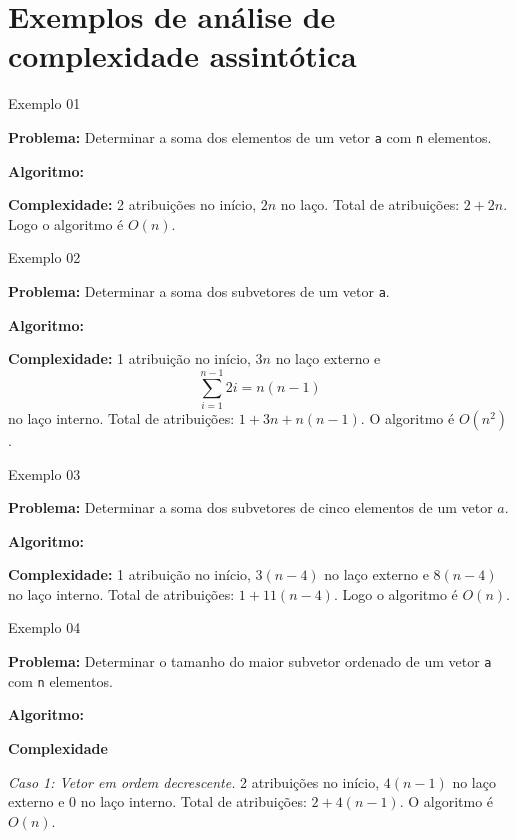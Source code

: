 \section{Exemplos de análise de complexidade assintótica}

\begin{frame}[fragile]{Exemplo 01}

	\textbf{Problema:} Determinar a soma dos elementos de um vetor \texttt{a} com \texttt{n}
     elementos.
	\vspace{0.1in}

	\textbf{Algoritmo:} 
	\vspace{0.2in}

	{\bf Complexidade: } 2 atribuições no início, $2n$ no laço. 
	{Total de atribuições:} $2 + 2n$.
	Logo o algoritmo é $O(n)$.

\end{frame} 

\begin{frame}[fragile]{Exemplo 02}

    {\bf Problema:} Determinar a soma dos subvetores  de um vetor \texttt{a}.
	\vspace{0.1in}

    {\bf Algoritmo:} 
	\vspace{0.2in}
    
    {\bf Complexidade: } 1 atribuição no início, $3n$ no laço 
    externo e $$\sum_{i=1}^{n-1} 2i = n(n-1)$$ no laço interno. 
    Total de atribuições: $1 + 3n + n(n-1)$.  O algoritmo é $O(n^2)$.
\end{frame}

\begin{frame}[fragile]{Exemplo 03}

    {\bf Problema:} Determinar a soma dos subvetores de cinco elementos de um vetor $a$.

    {\bf Algoritmo:} 
    \vspace{0.2in}

    {\bf Complexidade: } 1 atribuição no início, $3(n-4)$ no laço 
    externo e $8(n-4)$ no laço interno.
    {Total de atribuições:} $1 + 11(n-4)$. Logo o algoritmo é $O(n)$.

\end{frame}

\begin{frame}[fragile]{Exemplo 04}

	{\bf Problema:} Determinar o tamanho do maior subvetor ordenado de um 
	vetor \texttt{a} com \texttt{n} elementos.
	\vspace{0.1in}

    {\bf Algoritmo:} 
    \vspace{0.2in}
    
	{\bf Complexidade } 

    {\it Caso 1: Vetor em ordem decrescente.} 
    2 atribuições no início, $4(n-1)$ no laço externo e $0$ no laço 
    interno. {Total de atribuições:} $2 + 4(n-1)$.  O algoritmo é $O(n)$.

\end{frame}


